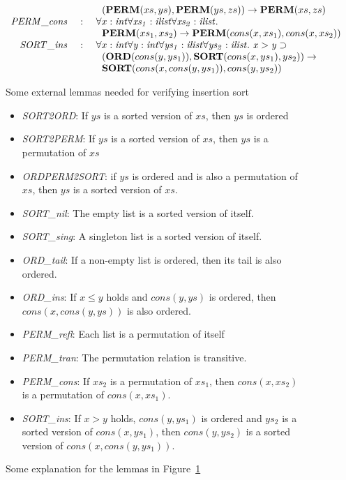 \documentclass{llncs}
\begin{document}
\begin{figure}[thp]
\[\begin{array}{rcl}
                 & &
\kern6pt({\bf PERM}(xs, ys), {\bf PERM}(ys, zs))\rightarrow {\bf PERM}(xs, zs) \\
{\it PERM\_cons} &~:~&
\forall x:\it int\forall xs_1:{\it ilist}\forall xs_2:{\it ilist}.~\\
                 & &
\kern6pt{\bf PERM}(xs_1, xs_2)\rightarrow{\bf PERM} (cons (x, xs_1), cons (x, xs_2)) \\
{\it SORT\_ins} &~:~&
\forall x:\it int\forall y:\it int\forall ys_1:{\it ilist}\forall ys_2:{\it ilist}.~x>y\supset\\
                & &
\kern6pt({\bf ORD} (cons (y, ys_1)), {\bf SORT} (cons (x, ys_1), ys_2)) \rightarrow \\
                & &
\kern6pt{\bf SORT}(cons (x, cons (y, ys_1)), cons (y, ys_2)) \\
\end{array}\]
\caption{Some external lemmas needed for verifying insertion sort}
\label{figure:insort_extern_lemmas}
\end{figure}
\begin{figure}[thp]
\begin{itemize}
\item{\it SORT2ORD}: If $ys$ is a sorted version of $xs$, then $ys$ is ordered
\item {\it SORT2PERM}: If $ys$ is a sorted version of $xs$, then $ys$ is a
  permutation of $xs$
\item {\it ORDPERM2SORT}: if $ys$ is ordered and is also a permutation
  of $xs$, then $ys$ is a sorted version of $xs$.
\item {\it SORT\_nil}: The empty list is a sorted version of itself.
\item {\it SORT\_sing}: A singleton list is a sorted version of itself.
\item
{\it ORD\_tail}: If a non-empty list is ordered, then its tail is also ordered.
\item
{\it ORD\_ins}: If $x\leq y$ holds and $cons(y, ys)$ is ordered, then
$cons(x, cons (y, ys))$ is also ordered.
\item {\it PERM\_refl}: Each list is a permutation of itself
\item {\it PERM\_tran}: The permutation relation is transitive.
\item {\it PERM\_cons}: If $xs_2$ is a permutation of $xs_1$, then
$cons (x, xs_2)$ is a permutation of $cons (x, xs_1)$.
\item {\it SORT\_ins}: If $x>y$ holds, $cons(y, ys_1)$ is ordered and
$ys_2$ is a sorted version of $cons(x, ys_1)$, then $cons (y, ys_2)$ is a
sorted version of $cons (x, cons (y, ys_1))$.
\end{itemize}
\caption{Some explanation for the lemmas in Figure~\ref{figure:insort_extern_lemmas}}
\label{figure:explanation_for_insort_extern_lemmas}
\end{figure}
\end{document}
